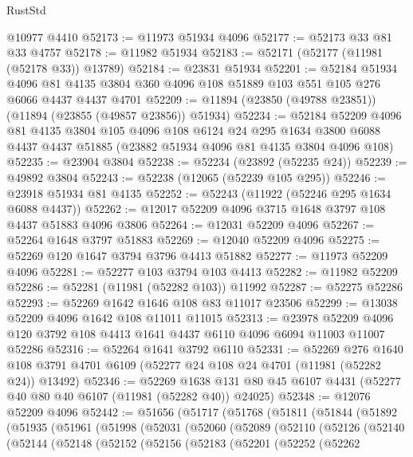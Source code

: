 \begin{lexlean}{RustStd}
\begin{coremodule}
    @10977
    @4410
@52173 := @11973 @51934 @4096
@52177 := @52173 @33 @81 @33 @4757
@52178 := @11982 @51934
@52183 := @52171 (@52177 (@11981 (@52178 @33)) @13789)
@52184 := @23831 @51934
@52201 := @52184
    @51934
    @4096
    @81
    @4135
    @3804
    @360
    @4096
    @108
    @51889
    @103
    @551
    @105
    @276
    @6066
    @4437
    @4437
    @4701
@52209 := @11894 (@23850 (@49788 @23851)) (@11894 (@23855 (@49857 @23856)) @51934)
@52234 := @52184
    @52209
    @4096
    @81
    @4135
    @3804
    @105
    @4096
    @108
    @6124
    @24
    @295
    @1634
    @3800
    @6088
    @4437
    @4437
    @51885
    (@23882 @51934 @4096 @81 @4135 @3804 @4096 @108)
@52235 := @23904 @3804
@52238 := @52234 (@23892 (@52235 @24))
@52239 := @49892 @3804
@52243 := @52238 (@12065 (@52239 @105 @295))
@52246 := @23918 @51934 @81 @4135
@52252 := @52243 (@11922 (@52246 @295 @1634 @6088 @4437))
@52262 := @12017 @52209 @4096 @3715 @1648 @3797 @108 @4437 @51883 @4096 @3806
@52264 := @12031 @52209 @4096
@52267 := @52264 @1648 @3797 @51883
@52269 := @12040 @52209 @4096
@52275 := @52269 @120 @1647 @3794 @3796 @4413 @51882
@52277 := @11973 @52209 @4096
@52281 := @52277 @103 @3794 @103 @4413
@52282 := @11982 @52209
@52286 := @52281 (@11981 (@52282 @103)) @11992
@52287 := @52275 @52286
@52293 := @52269 @1642 @1646 @108 @83 @11017 @23506
@52299 := @13038 @52209 @4096 @1642 @108 @11011 @11015
@52313 := @23978
    @52209
    @4096
    @120
    @3792
    @108
    @4413
    @1641
    @4437
    @6110
    @4096
    @6094
    @11003
    @11007
    @52286
@52316 := @52264 @1641 @3792 @6110
@52331 := @52269
    @276
    @1640
    @108
    @3791
    @4701
    @6109
    (@52277 @24 @108 @24 @4701 (@11981 (@52282 @24)) @13492)
@52346 := @52269
    @1638
    @131
    @80
    @45
    @6107
    @4431
    (@52277 @40 @80 @40 @6107 (@11981 (@52282 @40)) @24025)
@52348 := @12076 @52209 @4096
@52442 := @51656
    (@51717
      (@51768
        (@51811
          (@51844
            (@51892
              (@51935
                (@51961
                  (@51998
                    (@52031
                      (@52060
                        (@52089
                          (@52110
                            (@52126
                              (@52140
                                (@52144
                                  (@52148
                                    (@52152
                                      (@52156
                                        (@52183
                                          (@52201
                                            (@52252
                                              (@52262

\end{coremodule}
\end{lexlean}
